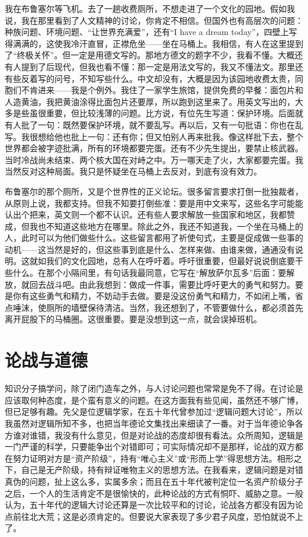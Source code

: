 我在布鲁塞尔等飞机。去了一趟收费厕所，不想走进了一个文化的园地。假如我说，我在那里看到了人文精神的讨论，你肯定不相信。但国外也有高层次的问题：种族问题、环境问题、“让世界充满爱”，还有“I have a dream today”，四壁上写得满满的，这使我冷汗直冒，正襟危坐——坐在马桶上。我相信，有人在这里提到了“终极关怀”。但一定是用德文写的。那地方德文的题字不少，我看不懂。大概还有人提到了后现代，但我也看不懂：那一定是用法文写的，我又不懂法文。那里还有些反着写的问号，不知写些什么。中文却没有，大概是因为该园地收费太贵，同胞们不肯进来——我是个例外。我住了一家学生旅馆，提供免费的早餐：面包片和人造黄油，我把黄油涂得比面包片还要厚，所以跑到这里来了。用英文写出的，大多是些虽很重要，但比较浅薄的问题。比方说，有位先生写道：保护环境。后面就有人批了一句：既然要保护环境，就不要乱写。再以后，又有一句批语：你也在乱写。我很想给他也批上一句：还有你；但又怕别人再来批我。像这样批下去，整个世界都会被字迹批满，所有的环境都要完蛋。还有不少先生提出，要禁止核武器。当时冷战尚未结束、两个核大国在对峙之中。万一哪天走了火，大家都要完蛋。我当然反对这种局面。我只是怀疑坐在马桶上去反对，到底有没有效力。 

布鲁塞尔的那个厕所，又是个世界性的正义论坛。很多留言要求打倒一批独裁者，从原则上说，我都支持。但我不知要打倒些准：要是用中文来写，这些名字可能能认出个把来，英文则一个都不认识。还有些人要求解放一些国家和地区，我都赞成，但我也不知道这些地方在哪里。除此之外，我还不知道我，一个坐在马桶上的人，此时可以为他们做些什么。这些留言都用了祈使句式，主要是促成做一些事的动机——这当然是好的，但这些事到底是什么、怎样来做、由谁来做，通通没有说明。这就如我们的文化园地，总有人在呼吁着。呼吁很重要，但最好说说倒底要干些什么。在那个小隔间里，有句话我最同意，它写在“解放萨尔瓦多”后面：要解放，就回去战斗吧。由此我想到：做成一件事，需要比呼吁更大的勇气和努力。要是你有这些勇气和精力，不妨动手去做。要是没这份勇气和精力，不如闭上嘴，省点唾沫，使厕所的墙壁保待清洁。当然，我还想到了，不管要做什么，都必须首先离开屁股下的马桶圈。这很重要。要是没想到这一点，就会误掉班机。
 
\chapter{论战与道德}

知识分子搞学问，除了闭门造车之外，与人讨论问题也常常是免不了得。在讨论是应该取何种态度，是个蛮有意义的问题。在这方面我有些见闻，虽然还不够广博，但已足够有趣。先父是位逻辑学家，在五十年代曾参加过“逻辑问题大讨论”，所以我虽然对逻辑所知不多，也把当年德论文集找出来细读了一番。对于当年德论争各方谁对谁错，我没有什么意见，但是对论战的态度却很有看法。众所周知，逻辑是一门严谨的科学，只要能争出个对错即可；可实际情况却不是那样，论战的双方都在努力证明对方是“资产阶级”，持有“唯心主义”或“形而上学”得思想方法。相形之下，自己是无产阶级，持有辩证唯物主义的思想方法。在我看来，逻辑问题是对错真伪的问题，扯上这么多，实属多余；而且在五十年代被判定位一名资产阶级分子之后，一个人的生活肯定不是很愉快的，此种论战的方式有恫吓、威胁之意。一般认为，五十年代的逻辑大讨论还算是一次比较平和的讨论，论战各方都没有因为论点前往北大荒；这是必须肯定的。但要说大家表现了多少君子风度，恐怕就说不上了。 

